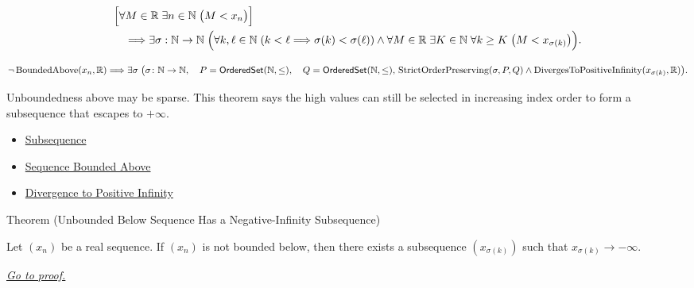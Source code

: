 \begin{remark*}
\[
\begin{aligned}
&\Bigl[
  \forall M\in\mathbb{R}\;\exists n\in\mathbb{N}\;\bigl(M<x_n\bigr)
\Bigr]\\
&\quad\Longrightarrow
\exists \sigma:\mathbb{N}\to\mathbb{N}\;
\Bigl(
  \forall k,\ell\in\mathbb{N}\;(k<\ell\Longrightarrow \sigma(k)<\sigma(\ell))
  \land
  \forall M\in\mathbb{R}\;\exists K\in\mathbb{N}\;\forall k\ge K
  \;\bigl(M<x_{\sigma(k)}\bigr)
\Bigr).
\end{aligned}
\]
\end{remark*}

\begin{remark*}
\[
\neg\operatorname{BoundedAbove}(x_n,\mathbb{R})
\Longrightarrow
\exists \sigma\;
\bigl(
  \sigma\colon\mathbb{N}\to\mathbb{N},\quad
  P=\mathsf{OrderedSet}(\mathbb{N},\leq),\quad
  Q=\mathsf{OrderedSet}(\mathbb{N},\leq),\\
  \operatorname{StrictOrderPreserving}(\sigma,P,Q)
  \land
  \operatorname{DivergesToPositiveInfinity}(x_{\sigma(k)},\mathbb{R})
\bigr).
\]
\end{remark*}

\begin{remark*}[Interpretation]
Unboundedness above may be sparse. This theorem says the high values can
still be selected in increasing index order to form a subsequence that
escapes to $+\infty$.
\end{remark*}

\begin{dependencies}
\begin{itemize}
  \item \hyperref[def:subsequence-of-sequence]{Subsequence}
  \item \hyperref[def:sequence-bounded-above]{Sequence Bounded Above}
  \item \hyperref[def:diverges-to-positive-infinity]{Divergence to Positive Infinity}
\end{itemize}
\end{dependencies}


\begin{theorembox}{Theorem (Unbounded Below Sequence Has a Negative-Infinity Subsequence)}
\begin{theorem}
\label{thm:unbounded-below-has-negative-infinity-subsequence}
Let $(x_n)$ be a real sequence. If $(x_n)$ is not bounded below, then
there exists a subsequence $(x_{\sigma(k)})$ such that
$x_{\sigma(k)}\to-\infty$.

\smallskip
\noindent
\hyperref[prf:unbounded-below-has-negative-infinity-subsequence]{\textit{Go to proof.}}
\end{theorem}
\end{theorembox}


